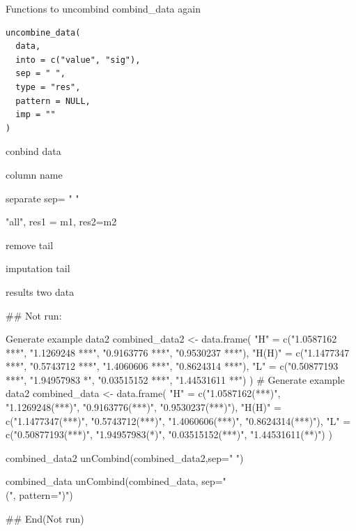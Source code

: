 \documentclass[a4paper]{book}
\begin{document}
%
\begin{Description}
Functions to uncombind combind\_data again
\end{Description}
%
\begin{Usage}
\begin{verbatim}
uncombine_data(
  data,
  into = c("value", "sig"),
  sep = " ",
  type = "res",
  pattern = NULL,
  imp = ""
)
\end{verbatim}
\end{Usage}
%
\begin{Arguments}
\begin{ldescription}
\item[\code{data}] conbind data

\item[\code{into}] column name

\item[\code{sep}] separate sep= " "

\item[\code{type}] "all", res1 = m1, res2=m2

\item[\code{pattern}] remove tail

\item[\code{imp}] imputation tail
\end{ldescription}
\end{Arguments}
%
\begin{Value}
results  two data
\end{Value}
%
\begin{Examples}
\begin{ExampleCode}
\#\# Not run: 

Generate example data2
combined_data2 <- data.frame(
  "H" = c("1.0587162 ***", "1.1269248 ***", "0.9163776 ***", "0.9530237 ***"),
  "H(H)" = c("1.1477347 ***", "0.5743712 ***", "1.4060606 ***", "0.8624314 ***"),
  "L" = c("0.50877193 ***", "1.94957983 *", "0.03515152 ***", "1.44531611 **")
)
# Generate example data2
combined_data <- data.frame(
  "H" = c("1.0587162(***)", "1.1269248(***)", "0.9163776(***)", "0.9530237(***)"),
  "H(H)" = c("1.1477347(***)", "0.5743712(***)", "1.4060606(***)", "0.8624314(***)"),
  "L" = c("0.50877193(***)", "1.94957983(*)", "0.03515152(***)", "1.44531611(**)")
)

combined_data2
unCombind(combined_data2,sep=" ")

combined_data
unCombind(combined_data, sep="\\(", pattern=")")



## End(Not run)
\end{ExampleCode}
\end{Examples}
\end{document}
